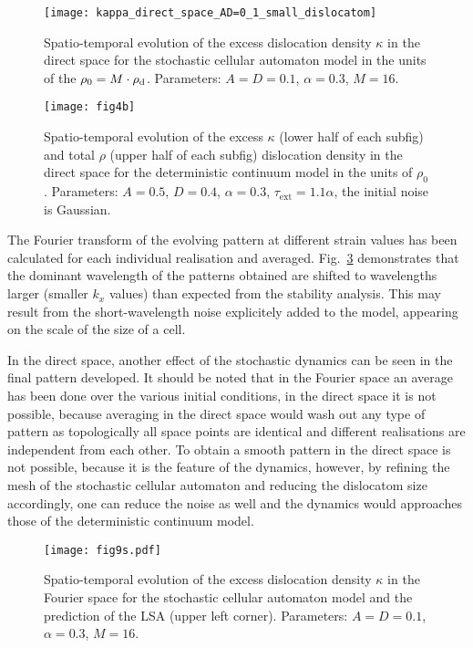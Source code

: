 \begin{figure}[htbp!] 
\centering    
\texttt{[image: kappa\_direct\_space\_AD=0\_1\_small\_dislocatom]}
\caption[$\kappa$ evolution in the stochastic model]{Spatio-temporal evolution of the excess dislocation density $\kappa$ in the direct space for the stochastic cellular automaton model in the units of the $\rho_0 = M\cdot \rho_{\rm{d}}$. Parameters: $A=D=0.1$, $\alpha=0.3$, $M=16$.}
\label{fig:pattern_kappa_evolution_SCA}
\end{figure}

\begin{figure}[htbp!] 
\centering    
\texttt{[image: fig4b]}
\caption[$\kappa$, $\rho$ evolution in the deterministic model]{Spatio-temporal evolution of the excess $\kappa$ (lower half of each subfig) and total $\rho$ (upper half of each subfig) dislocation density in the direct space for the deterministic continuum model in the units of $\rho_0$. Parameters: $A=0.5$, $D=0.4$, $\alpha=0.3$, ${\tau _{{\text{ext}}}} = 1.1\alpha $, the initial noise is Gaussian.}
\label{fig:pattern_kappa_evolution_DCM}
\end{figure}

The Fourier transform of the evolving pattern at different strain values has been calculated for each individual realisation and averaged. Fig.~\ref{fig:pattern_kappa_evolution_SCA_fourier} demonstrates that the dominant wavelength of the patterns obtained are shifted to wavelengths larger (smaller $k_x$ values) than expected from the stability analysis. This may result from the short-wavelength noise explicitely added to the model, appearing on the scale of the size of a cell.

In the direct space, another effect of the stochastic dynamics can be seen in the final pattern developed. It should be noted that in the Fourier space an average has been done over the various initial conditions, in the direct space it is not possible, because averaging in the direct space would wash out any type of pattern as topologically all space points are identical and different realisations are independent from each other. To obtain a smooth pattern in the direct space is not possible, because it is the feature of the dynamics, however, by refining the mesh of the stochastic cellular automaton and reducing the dislocatom size accordingly, one can reduce the noise as well and the dynamics would approaches those of the deterministic continuum model.

\begin{figure}[htbp!] 
\centering    
\texttt{[image: fig9s.pdf]}
\caption[Fourier transform of $\kappa$, stochastic model]{Spatio-temporal evolution of the excess dislocation density $\kappa$ in the Fourier space for the stochastic cellular automaton model and the prediction of the LSA (upper left corner). Parameters: $A=D=0.1$, $\alpha=0.3$, $M=16$.}
\label{fig:pattern_kappa_evolution_SCA_fourier}
\end{figure}


